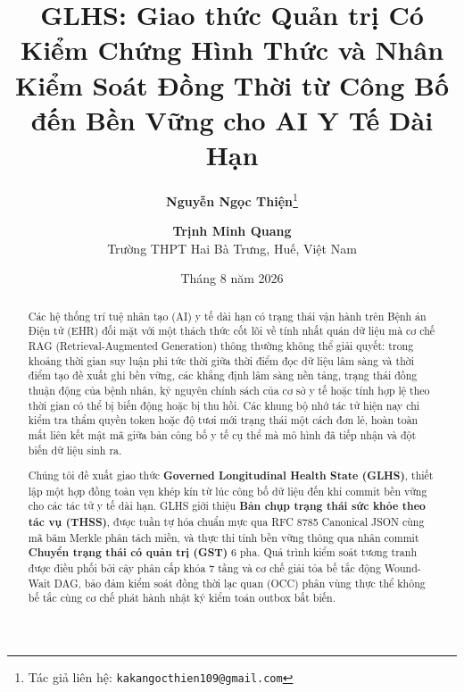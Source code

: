 \documentclass[11pt,a4paper]{article}
\title{\LARGE\textbf{GLHS: Giao thức Quản trị Có Kiểm Chứng Hình Thức và Nhân Kiểm Soát Đồng Thời từ Công Bố đến Bền Vững cho AI Y Tế Dài Hạn}}
\author{\textbf{Nguyễn Ngọc Thiện}\thanks{Tác giả liên hệ: \texttt{kakangocthien109@gmail.com}} \quad\and\quad \textbf{Trịnh Minh Quang}\\[0.35em]
\small Trường THPT Hai Bà Trưng, Huế, Việt Nam}
\date{Tháng 8 năm 2026}
\begin{document}
\maketitle

\begin{abstract}
Các hệ thống trí tuệ nhân tạo (AI) y tế dài hạn có trạng thái vận hành trên Bệnh án Điện tử (EHR) đối mặt với một thách thức cốt lõi về tính nhất quán dữ liệu mà cơ chế RAG (Retrieval-Augmented Generation) thông thường không thể giải quyết: trong khoảng thời gian suy luận phi tức thời giữa thời điểm đọc dữ liệu lâm sàng và thời điểm tạo đề xuất ghi bền vững, các khẳng định lâm sàng nền tảng, trạng thái đồng thuận động của bệnh nhân, kỷ nguyên chính sách của cơ sở y tế hoặc tính hợp lệ theo thời gian có thể bị biến động hoặc bị thu hồi. Các khung bộ nhớ tác tử hiện nay chỉ kiểm tra thẩm quyền token hoặc độ tươi mới trạng thái một cách đơn lẻ, hoàn toàn mất liên kết mật mã giữa bản công bố y tế cụ thể mà mô hình đã tiếp nhận và đột biến dữ liệu sinh ra.

Chúng tôi đề xuất giao thức \textbf{Governed Longitudinal Health State (GLHS)}, thiết lập một hợp đồng toàn vẹn khép kín từ lúc công bố dữ liệu đến khi commit bền vững cho các tác tử y tế dài hạn. GLHS giới thiệu \textbf{Bản chụp trạng thái sức khỏe theo tác vụ (THSS)}, được tuần tự hóa chuẩn mực qua RFC 8785 Canonical JSON cùng mã băm Merkle phân tách miền, và thực thi tính bền vững thông qua nhân commit \textbf{Chuyển trạng thái có quản trị (GST)} 6 pha. Quá trình kiểm soát tương tranh được điều phối bởi cây phân cấp khóa 7 tầng và cơ chế giải tỏa bế tắc động Wound-Wait DAG, bảo đảm kiểm soát đồng thời lạc quan (OCC) phân vùng thực thể không bế tắc cùng cơ chế phát hành nhật ký kiểm toán outbox bất biến.


\end{abstract}
\end{document}
